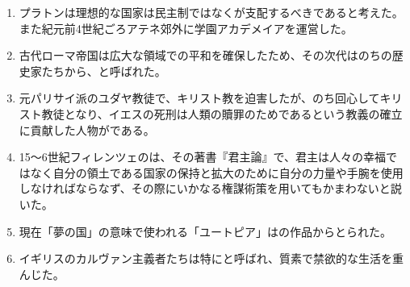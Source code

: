 \documentclass[uplatex,dvipdfmx]{jsarticle}
\begin{document}
\begin{enumerate}



 \item プラトンは理想的な国家は民主制ではなく{\anaume{}}が支配するべきであると考えた。また紀元前4世紀ごろアテネ郊外に学園アカデメイアを運営した。

\item 古代ローマ帝国は広大な領域での平和を確保したため、その次代はのちの歴史家たちから、\anaume{}と呼ばれた。
  
\item 元パリサイ派のユダヤ教徒で、キリスト教を迫害したが、のち回心してキリスト教徒となり、イエスの死刑は人類の贖罪のためであるという教義の確立に貢献した人物が\anaume{}である。

\item 15〜6世紀フィレンツェの\anaume{}は、その著書『君主論』で、君主は人々の幸福ではなく自分の領土である国家の保持と拡大のために自分の力量や手腕を使用しなければならなず、その際にいかなる権謀術策を用いてもかまわないと説いた。

\item 現在「夢の国」の意味で使われる「ユートピア」は\anaume{}の作品からとられた。
  
\item イギリスのカルヴァン主義者たちは特に\anaume{}と呼ばれ、質素で禁欲的な生活を重んじた。







\end{enumerate}
\end{document}
